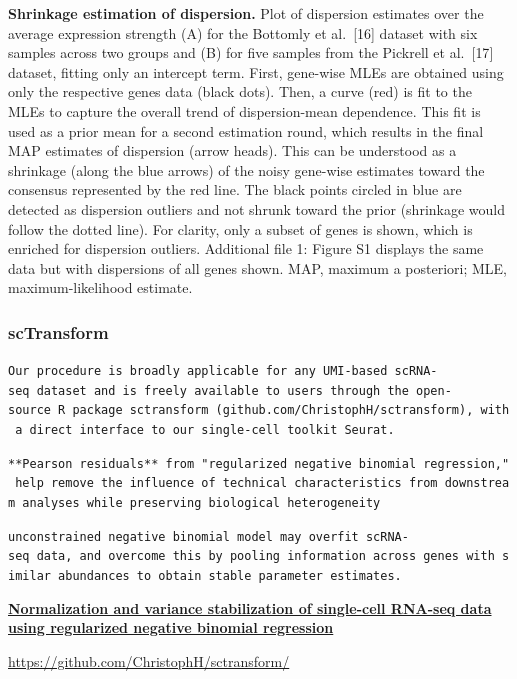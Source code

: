 \documentclass[
]{book}
\begin{document}
\textbf{Shrinkage estimation of dispersion.} Plot of dispersion estimates over the average expression strength (A) for the Bottomly et al.~{[}16{]} dataset with six samples across two groups and (B) for five samples from the Pickrell et al.~{[}17{]} dataset, fitting only an intercept term. First, gene-wise MLEs are obtained using only the respective genes data (black dots). Then, a curve (red) is fit to the MLEs to capture the overall trend of dispersion-mean dependence. This fit is used as a prior mean for a second estimation round, which results in the final MAP estimates of dispersion (arrow heads). This can be understood as a shrinkage (along the blue arrows) of the noisy gene-wise estimates toward the consensus represented by the red line. The black points circled in blue are detected as dispersion outliers and not shrunk toward the prior (shrinkage would follow the dotted line). For clarity, only a subset of genes is shown, which is enriched for dispersion outliers. Additional file 1: Figure S1 displays the same data but with dispersions of all genes shown. MAP, maximum a posteriori; MLE, maximum-likelihood estimate.

\hypertarget{sctransform}{%
\subsubsection{scTransform}\label{sctransform}}

\texttt{Our\ procedure\ is\ broadly\ applicable\ for\ any\ UMI-based\ scRNA-seq\ dataset\ and\ is\ freely\ available\ to\ users\ through\ the\ open-source\ R\ package\ sctransform\ (github.com/ChristophH/sctransform),\ with\ a\ direct\ interface\ to\ our\ single-cell\ toolkit\ Seurat.}

\texttt{**Pearson\ residuals**\ from\ "regularized\ negative\ binomial\ regression,"\ help\ remove\ the\ influence\ of\ technical\ characteristics\ from\ downstream\ analyses\ while\ preserving\ biological\ heterogeneity}

\texttt{unconstrained\ negative\ binomial\ model\ may\ overfit\ scRNA-seq\ data,\ and\ overcome\ this\ by\ pooling\ information\ across\ genes\ with\ similar\ abundances\ to\ obtain\ stable\ parameter\ estimates.}

\textbf{\href{https://genomebiology.biomedcentral.com/articles/10.1186/s13059-019-1874-1}{Normalization and variance stabilization of single-cell RNA-seq data using regularized negative binomial regression}\citep{hafemeister2019normalization}}

\url{https://github.com/ChristophH/sctransform/}
\end{document}
